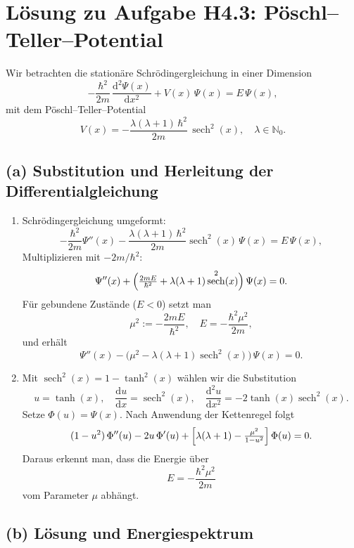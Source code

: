 \documentclass[a4paper,11pt]{article}
\DeclareMathOperator{\sech}{sech}
\begin{document}
\section*{Lösung zu Aufgabe H4.3: Pöschl–Teller–Potential}

Wir betrachten die stationäre Schrödinger­gleichung in einer Dimension
\[
-\frac{\hbar^2}{2m}\,\frac{\mathrm{d}^2\Psi(x)}{\mathrm{d}x^2}
+V(x)\,\Psi(x)=E\,\Psi(x),
\]
mit dem Pöschl–Teller–Potential
\[
V(x)=-\frac{\lambda(\lambda+1)\,\hbar^2}{2m}\,\sech^2(x),
\quad \lambda\in\mathbb{N}_0.
\]

\subsection*{(a) Substitution und Herleitung der Differentialgleichung}

\begin{enumerate}
  \item Schrödinger­gleichung umgeformt:
  \[
    -\frac{\hbar^2}{2m}\Psi''(x)
    -\frac{\lambda(\lambda+1)\,\hbar^2}{2m}\sech^2(x)\,\Psi(x)
    =E\,\Psi(x),
  \]
  Multiplizieren mit $-2m/\hbar^2$:
  \[
    \Psi''(x)+\Bigl(\tfrac{2mE}{\hbar^2}+\lambda(\lambda+1)\sech^2(x)\Bigr)\,\Psi(x)=0.
  \]
  Für gebundene Zustände ($E<0$) setzt man
  \[
    \mu^2:=-\frac{2mE}{\hbar^2}, 
    \quad E=-\frac{\hbar^2\mu^2}{2m},
  \]
  und erhält
  \[
    \Psi''(x)-\bigl(\mu^2-\lambda(\lambda+1)\sech^2(x)\bigr)\,\Psi(x)=0.
  \]

  \item Mit $\sech^2(x)=1-\tanh^2(x)$ wählen wir die Substitution
  \[
    u=\tanh(x), 
    \quad \frac{\mathrm{d}u}{\mathrm{d}x}=\sech^2(x), 
    \quad \frac{\mathrm{d}^2u}{\mathrm{d}x^2}=-2\tanh(x)\sech^2(x).
  \]
  Setze $\Phi(u)=\Psi(x)$. Nach Anwendung der Kettenregel folgt
  \[
    (1-u^2)\,\Phi''(u)-2u\,\Phi'(u)
    +\Bigl[\lambda(\lambda+1)-\tfrac{\mu^2}{1-u^2}\Bigr]\,\Phi(u)=0.
  \]
  Daraus erkennt man, dass die Energie über
  \[
    E=-\frac{\hbar^2\mu^2}{2m}
  \]
  vom Parameter $\mu$ abhängt.
\end{enumerate}

\subsection*{(b) Lösung und Energiespektrum}
\end{document}
